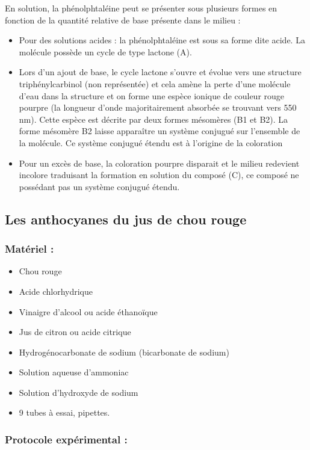 \documentclass[11pt,a4paper]{report}
\begin{document}
En solution, la phénolphtaléine peut se présenter sous plusieurs formes en fonction de la quantité relative de base présente dans le milieu :
\begin{itemize}
	\item Pour des solutions acides : la phénolphtaléine est sous sa forme dite acide. La molécule 				possède un cycle de type lactone (A).
	\item Lors d'un ajout de base, le cycle lactone s'ouvre et évolue vers une structure 						triphénylcarbinol (non représentée) et cela amène la perte d'une molécule d'eau dans la 				structure et on forme une espèce ionique de couleur rouge pourpre (la longueur d'onde 					majoritairement absorbée se trouvant vers 550 nm). Cette espèce est décrite par deux formes 			mésomères (B1 et B2). La forme mésomère B2 laisse apparaître un système conjugué sur l'ensemble 		de la molécule. Ce système conjugué étendu est à l'origine de la coloration
	\item Pour un excès de base, la coloration pourpre disparait et le milieu redevient incolore 				traduisant la formation en solution du composé (C), ce composé ne possédant pas un système 				conjugué étendu.
\end{itemize}

\newpage
\subsection*{Les anthocyanes du jus de chou rouge}
\subsubsection{Matériel :}
\begin{itemize}
	\item Chou rouge
	\item Acide chlorhydrique
	\item Vinaigre d'alcool ou acide éthanoïque
	\item Jus de citron ou acide citrique
	\item Hydrogénocarbonate de sodium (bicarbonate de sodium)
	\item Solution aqueuse d'ammoniac
	\item Solution d'hydroxyde de sodium
	\item 9 tubes à essai, pipettes.
\end{itemize}

\subsubsection*{Protocole expérimental :}
\end{document}
